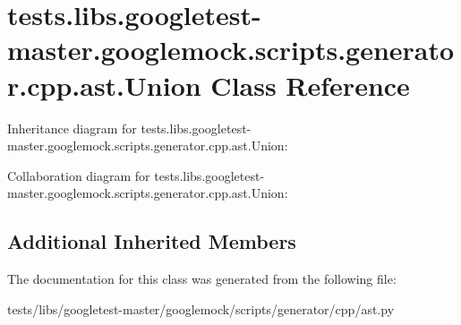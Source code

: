 \hypertarget{classtests_1_1libs_1_1googletest-master_1_1googlemock_1_1scripts_1_1generator_1_1cpp_1_1ast_1_1Union}{}\section{tests.\+libs.\+googletest-\/master.googlemock.\+scripts.\+generator.\+cpp.\+ast.\+Union Class Reference}
\label{classtests_1_1libs_1_1googletest-master_1_1googlemock_1_1scripts_1_1generator_1_1cpp_1_1ast_1_1Union}


Inheritance diagram for tests.\+libs.\+googletest-\/master.googlemock.\+scripts.\+generator.\+cpp.\+ast.\+Union\+:


Collaboration diagram for tests.\+libs.\+googletest-\/master.googlemock.\+scripts.\+generator.\+cpp.\+ast.\+Union\+:
\subsection*{Additional Inherited Members}


The documentation for this class was generated from the following file\+:\begin{DoxyCompactItemize}
\item 
tests/libs/googletest-\/master/googlemock/scripts/generator/cpp/ast.\+py\end{DoxyCompactItemize}
